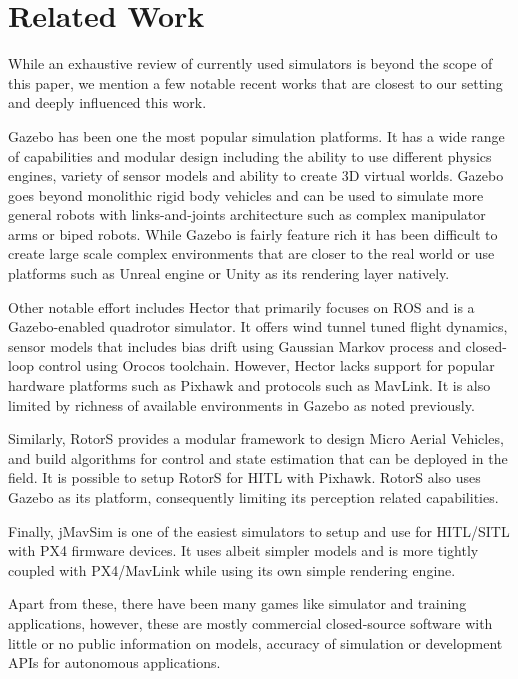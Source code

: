 \documentclass[graybox]{svmult}
\begin{document}
\section{Related Work}
While an exhaustive review of currently used simulators is beyond the scope of this paper, we mention a few notable recent works that are closest to our setting and deeply influenced this work.

Gazebo \cite{koenig2004design} has been one the most popular simulation platforms. It has a wide range of capabilities and modular design including the ability to use different physics engines, variety of sensor models and ability to create 3D virtual worlds. Gazebo goes beyond monolithic rigid body vehicles and can be used to simulate more general robots with links-and-joints architecture such as complex manipulator arms or biped robots. While Gazebo is fairly feature rich it has been difficult to create large scale complex environments that are closer to the real world or use platforms such as Unreal engine or Unity as its rendering layer natively. 

Other notable effort includes Hector \cite{meyer2012comprehensive} that primarily focuses on ROS and is a Gazebo-enabled quadrotor simulator. It offers wind tunnel tuned flight dynamics, sensor models that includes bias drift using Gaussian Markov process and closed-loop control using Orocos toolchain. However, Hector lacks support for popular hardware platforms such as Pixhawk and protocols such as MavLink. It is also limited by richness of available environments in Gazebo as noted previously.

Similarly, RotorS \cite{furrer2016rotors} provides a modular framework to design Micro Aerial Vehicles, and build algorithms for control and state estimation that can be deployed in the field. It is possible to setup RotorS for HITL with Pixhawk. RotorS also uses Gazebo as its platform, consequently limiting its perception related capabilities. 

Finally, jMavSim \cite{jmavsim} is one of the easiest simulators to setup and use for HITL/SITL with PX4 firmware devices. It uses albeit simpler models and is more tightly coupled with PX4/MavLink while using its own simple rendering engine. 

Apart from these, there have been many games like simulator and training applications, however, these are mostly commercial closed-source software with little or no public information on models, accuracy of simulation or development APIs for autonomous applications.
\end{document}
